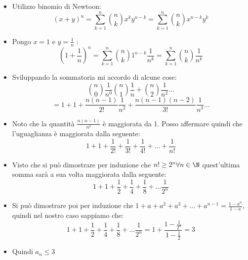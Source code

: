 \begin{itemize}
	\item  Utilizzo binomio di Newtoon:
	      \[
		      \left( x+y \right)^{n} = \sum_{k=1}^{n} \binom{n}{k}x^{k}y^{n-k} = \sum_{k=1}^{n} \binom{n}{k} x^{n-k}y^{k}
	      \]
	\item Pongo $x=1$ e $y= \frac{1}{n}$ :
	      \[
		      \left( 1+\frac{1}{n} \right) ^{n}= \sum_{k=1}^{n} \binom{n}{k}1^{n-k}\frac{1}{n^{k}} = \sum_{k=1}^{n} \binom{n}{k} \frac{1}{n^{k}}
	      \]
	\item Sviluppando la sommatoria mi accordo di alcune cose:
	      \[
		      \binom{n}{0}\frac{1}{n^{0}}  \binom{n}{1} \frac{1}{n} + \binom{n}{2}\frac{1}{n^2}\ldots
	      \]
	      \[
		      = 1 + 1 + \frac{n \left( n-1 \right) }{2!} \frac{1}{n^2} + \frac{n \left( n-1 \right) \left( n-2 \right) }{3!} \frac{1}{n^3} \ldots
	      \]
	\item Noto che la quantità $ \frac{n\left( n-1 \right) }{n^2}$ è maggiorata da 1. Posso affermare quindi che l'uguaglianza è maggiorata dalla seguente:
	      \[
		      1+1+\frac{1}{2!}+ \frac{1}{3!}+ \frac{1}{4!}+\ldots+ \frac{1}{n!}
	      \]
	\item Visto che si può dimostrare per induzione che $ n! \ge 2^{n} \forall n \in  \N$ quest'ultima somma sarà a sua volta maggiorata dalla seguente:
	      \[
		      1+1+\frac{1}{2} + \frac{1}{4} + \frac{1}{8} + \ldots \frac{1}{2^n}
	      \]
	\item Si può dimostrare poi per induzione che $1 + a + a^2 + a^3 + \ldots + a^{n-1} = \frac{1-a^{n}}{1-a}$, quindi nel nostro caso sappiamo che:
	      \[
		      1+1+\frac{1}{2} + \frac{1}{4} + \frac{1}{8} + \ldots \frac{1}{2^n} = 1+\frac{1-\frac{1}{2^{n}}}{1-\frac{1}{2}} = 3
	      \]
	\item Quindi $a_n \le 3$
\end{itemize}

